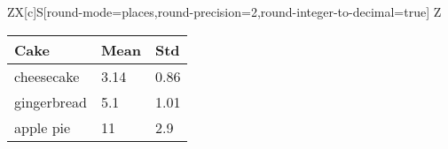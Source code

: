 
\newcolumntype Z{X[c]{S[round-mode=places,round-precision=2,round-integer-to-decimal=true]}}%
\tabucolumn Z%

\begin{tabu} spread 0pt {X[l] *{2}{Z}}
	\toprule
	Cake        & {Mean} & {Std} \\
	\midrule
	cheesecake  & 3.14   & 0.86  \\
	gingerbread & 5.1    & 1.01  \\
	apple pie   & 11     & 2.9   \\
	\bottomrule
\end{tabu}
